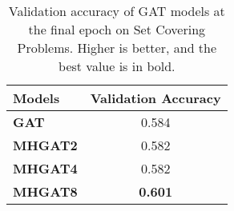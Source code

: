 \begin{table}[htb!]
    \centering
    \begin{tabular}{|l c|}
        \hline
        \textbf{Models} & \textbf{Validation Accuracy}\\
        \hline
        \textbf{GAT} & 0.584\\
        \textbf{MHGAT2} & 0.582\\
        \textbf{MHGAT4} & 0.582\\
        \textbf{MHGAT8} & \textbf{0.601}\\
        \hline
    \end{tabular}
    \caption{Validation accuracy of GAT models at the final epoch on Set Covering Problems.
    Higher is better, and the best value is in bold.}
    \label{tab:sc-validation-accuracy}
\end{table}